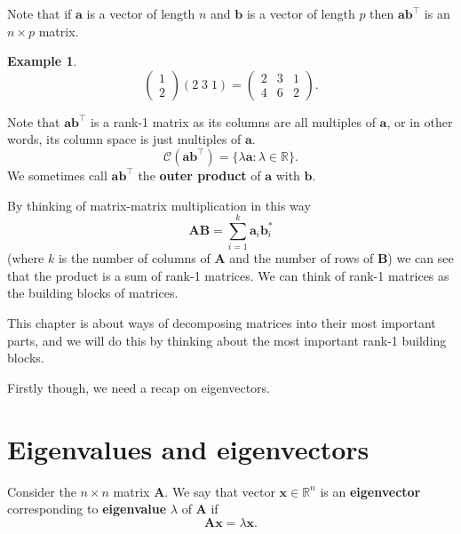 \documentclass[]{book}
\theoremstyle{definition}
\theoremstyle{definition}
\newtheorem{example}{Example}[chapter]
\theoremstyle{definition}
\theoremstyle{remark}
\begin{document}
Note that if \(\boldsymbol a\) is a vector of length \(n\) and \(\boldsymbol b\) is a vector of length \(p\) then
\(\boldsymbol a\boldsymbol b^\top\) is an \(n\times p\) matrix.

\begin{example}
\protect\hypertarget{exm:unnamed-chunk-1}{}{\label{exm:unnamed-chunk-1} }
\[\left( 
  \begin{array}{c}
1\\
2\end{array}
\right)
\left(2 \; 3\; 1\right)=
  \left(\begin{array}{ccc}
                                      2&3&1\\
                                      4&6&2
                                      \end{array}
                                      \right).
  \]
\end{example}
Note that \(\boldsymbol a\boldsymbol b^\top\) is a rank-1 matrix as its columns are all multiples of \(\boldsymbol a\), or in other words, its column space is just multiples of \(\boldsymbol a\).
\[\mathcal{C}(\boldsymbol a\boldsymbol b^\top) = \{\lambda \boldsymbol a: \lambda \in \mathbb{R}\}.\]
We sometimes call \(\boldsymbol a\boldsymbol b^\top\) the \textbf{outer product} of \(\boldsymbol a\) with \(\boldsymbol b\).

By thinking of matrix-matrix multiplication in this way
\[\boldsymbol A\boldsymbol B=\sum_{i=1}^k \boldsymbol a_i \boldsymbol b_i^*\]
(where \(k\) is the number of columns of \(\boldsymbol A\) and the number of rows of \(\boldsymbol B\))
we can see that the product is a sum of rank-1 matrices.
We can think of rank-1 matrices as the building blocks of matrices.

This chapter is about ways of decomposing matrices into their most important parts, and we will do this by thinking about the most important rank-1 building blocks.

Firstly though, we need a recap on eigenvectors.

\hypertarget{eigenvalues-and-eigenvectors}{%
\section{Eigenvalues and eigenvectors}\label{eigenvalues-and-eigenvectors}}

Consider the \(n\times n\) matrix \(\boldsymbol A\).
We say that
vector \(\boldsymbol x\in \mathbb{R}^n\) is an \textbf{eigenvector} corresponding to \textbf{eigenvalue} \(\lambda\) of \(\boldsymbol A\) if
\[{\mathbf A} {\mathbf x} = \lambda {\mathbf x}.\]
\end{document}

